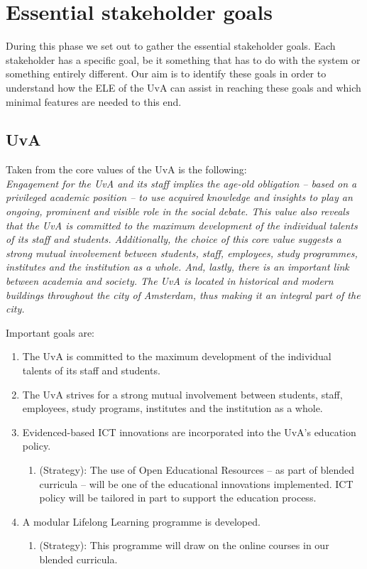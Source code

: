 \chapter{Essential stakeholder goals}\label{stakeholder_goals}
During this phase we set out to gather the essential stakeholder goals. Each stakeholder has a specific goal, be it something that has to do with the system or something entirely different. Our aim is to identify these goals in order to understand how the ELE of the UvA can assist in reaching these goals and which minimal features are needed to this end.

\section{UvA}
\label{uva_goals}
Taken from the core values of the UvA is the following: \\
\textit{Engagement for the UvA and its staff implies the age-old obligation – based on a privileged academic position – to use acquired knowledge and insights to play an ongoing, prominent and visible role in the social debate. This value also reveals that the UvA is committed to the maximum development of the individual talents of its staff and students. Additionally, the choice of this core value suggests a strong mutual involvement between students, staff, employees, study programmes, institutes and the institution as a whole. And, lastly, there is an important link between academia and society. The UvA is located in historical and modern buildings throughout the city of Amsterdam, thus making it an integral part of the city.}

Important goals are:
\begin{enumerate}
	\item The UvA is committed to the maximum development of the individual talents of its staff and students.\cite{uva_mission}
	\item The UvA strives for a strong mutual involvement between students, staff, employees, study programs, institutes and the institution as a whole.\cite{uva_mission}
	\item Evidenced-based ICT innovations are incorporated into the UvA’s education policy.\cite{uva_strategic_plan} \begin{enumerate}
		\item (Strategy): The use of Open Educational Resources – as part of blended curricula – will be one of the educational innovations implemented. ICT policy will be tailored in part to support the education process. 
	\end{enumerate}
	\item A modular Lifelong Learning programme is developed.\cite{uva_strategic_plan} \begin{enumerate}
		\item (Strategy): This programme will draw on the online
		courses in our blended curricula. 
	\end{enumerate}
\end{enumerate}

